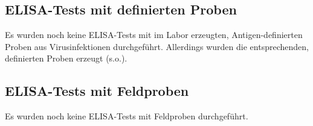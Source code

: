 \subsection{ELISA-Tests mit definierten Proben}
Es wurden noch keine ELISA-Tests mit im Labor erzeugten, Antigen-definierten Proben aus Virusinfektionen durchgeführt. Allerdings wurden die entsprechenden, definierten Proben erzeugt (s.o.).

\subsection{ELISA-Tests mit Feldproben}
Es wurden noch keine ELISA-Tests mit Feldproben durchgeführt.

















